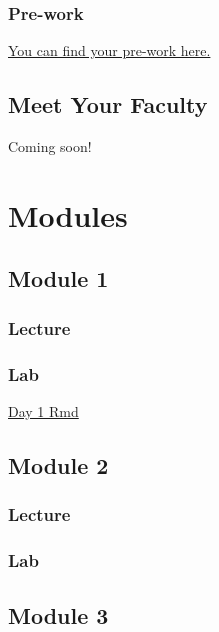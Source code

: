 \documentclass[
]{book}
\begin{document}
\section{Pre-work}\label{pre-work}

\href{https://docs.google.com/forms/d/e/1FAIpQLSeAV5gz7dADoF7JQCih9yOF7GP0IwOIxDK1ClG3jxB9yiJaQA/viewform?usp=dialog}{You can find your pre-work here.}

\chapter{Meet Your Faculty}\label{meet-your-faculty}

Coming soon!

\part{Modules}\label{part-modules}

\chapter{Module 1}\label{module-1}

\section{Lecture}\label{lecture}

\section{Lab}\label{lab}

\href{https://drive.google.com/file/d/1yfOvH9V7Bfv10zSSZn7YVtd-onhiR1zl/view?usp=sharing}{Day 1 Rmd}

\chapter{Module 2}\label{module-2}

\section{Lecture}\label{lecture-1}

\section{Lab}\label{lab-1}

\chapter{Module 3}\label{module-3}
\end{document}
